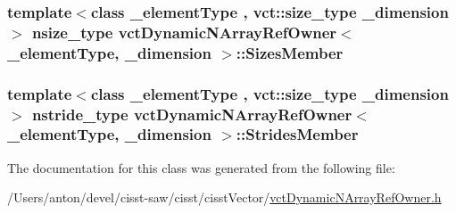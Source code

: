 \subsubsection[{Sizes\+Member}]{\setlength{\rightskip}{0pt plus 5cm}template$<$class \+\_\+element\+Type , vct\+::size\+\_\+type \+\_\+dimension$>$ nsize\+\_\+type {\bf vct\+Dynamic\+N\+Array\+Ref\+Owner}$<$ \+\_\+element\+Type, \+\_\+dimension $>$\+::Sizes\+Member\hspace{0.3cm}{\ttfamily [protected]}}\label{classvct_dynamic_n_array_ref_owner_af231e48b1bbeb0320c3e6cffffa1dc20}
\hypertarget{classvct_dynamic_n_array_ref_owner_a51d8276e7feb516e682465d378ae2521}{}
\subsubsection[{Strides\+Member}]{\setlength{\rightskip}{0pt plus 5cm}template$<$class \+\_\+element\+Type , vct\+::size\+\_\+type \+\_\+dimension$>$ nstride\+\_\+type {\bf vct\+Dynamic\+N\+Array\+Ref\+Owner}$<$ \+\_\+element\+Type, \+\_\+dimension $>$\+::Strides\+Member\hspace{0.3cm}{\ttfamily [protected]}}\label{classvct_dynamic_n_array_ref_owner_a51d8276e7feb516e682465d378ae2521}


The documentation for this class was generated from the following file\+:\begin{DoxyCompactItemize}
\item 
/\+Users/anton/devel/cisst-\/saw/cisst/cisst\+Vector/\hyperlink{vct_dynamic_n_array_ref_owner_8h}{vct\+Dynamic\+N\+Array\+Ref\+Owner.\+h}\end{DoxyCompactItemize}
